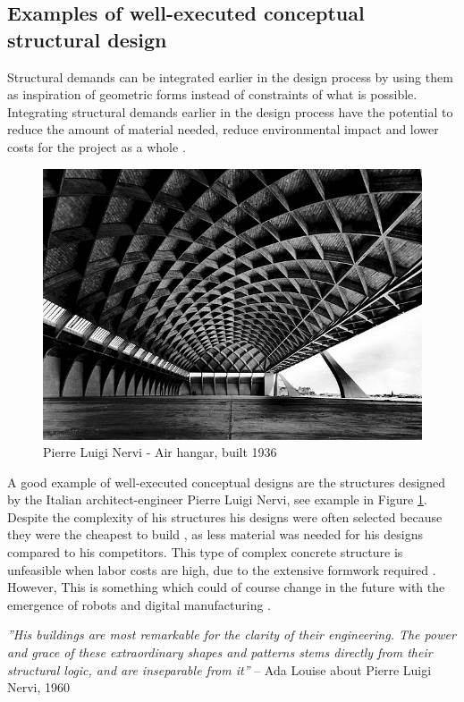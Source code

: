 \subsection{Examples of well-executed conceptual structural design}
Structural demands can be integrated earlier in the design process by using them as inspiration of geometric forms instead of constraints of what is possible. Integrating structural demands earlier in the design process have the potential to reduce the amount of material needed, reduce environmental impact and lower costs for the project as a whole \cite{Mueller2014}. 

\begin{figure}
  \includegraphics[width=350pt]{graphics/nervi.jpg}
  \caption{Pierre Luigi Nervi - Air hangar, built 1936}
  \label{fig:nervi}
\end{figure}

A good example of well-executed conceptual designs are the structures designed by the Italian architect-engineer Pierre Luigi Nervi, see example in Figure \ref{fig:nervi}. Despite the complexity of his structures his designs were often selected because they were the cheapest to build \cite{Addis2007}, as less material was needed for his designs compared to his competitors. This type of complex concrete structure is unfeasible when labor costs are high, due to the extensive formwork required \cite{Todisco2015}. However, This is something which could of course change in the future with the emergence of robots and digital manufacturing \cite{MadeByRobots}.

\textit{''His buildings are most remarkable for the clarity of their engineering. The power and grace of these extraordinary shapes and patterns stems directly from their structural logic, and are inseparable from it''} – Ada Louise about Pierre Luigi Nervi, 1960 \cite{Mueller2014}

